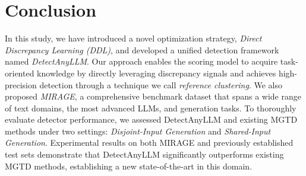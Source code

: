 \section{Conclusion}
In this study, we have introduced a novel optimization strategy, \textit{Direct Discrepancy Learning (DDL)}, and developed a unified detection framework named \textit{DetectAnyLLM}.
%
Our approach enables the scoring model to acquire task-oriented knowledge by directly leveraging discrepancy signals and achieves high-precision detection through a technique we call \textit{reference clustering}.
%
We also proposed \textit{MIRAGE}, a comprehensive benchmark dataset that spans a wide range of text domains, the most advanced LLMs, and generation tasks.
%
To thoroughly evaluate detector performance, we assessed DetectAnyLLM and existing MGTD methods under two settings: \textit{Disjoint-Input Generation} and \textit{Shared-Input Generation}.
%
Experimental results on both MIRAGE and previously established test sets demonstrate that DetectAnyLLM significantly outperforms existing MGTD methods, establishing a new state-of-the-art in this domain.